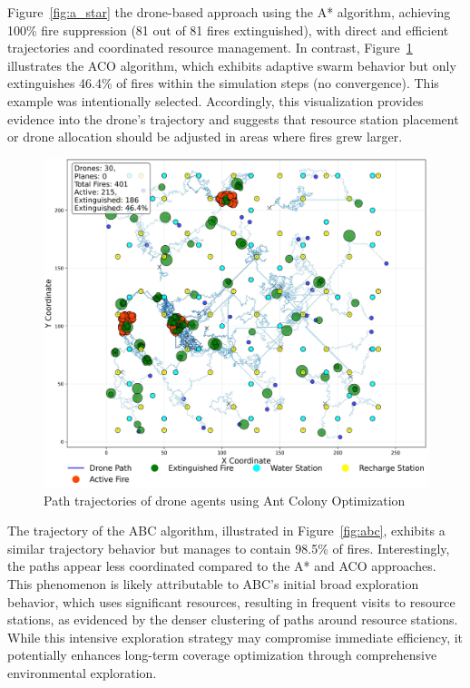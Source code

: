 \documentclass[11pt, a4paper]{article}
\begin{document}
Figure~\ref{fig:a_star} the drone-based approach using the A* algorithm, achieving 100\% fire suppression (81 out of 81 fires extinguished), with direct and efficient trajectories and coordinated resource management. In contrast, Figure~\ref{fig:aco} illustrates the ACO algorithm, which exhibits adaptive swarm behavior but only extinguishes 46.4\% of fires within the simulation steps (no convergence). This example was intentionally selected. Accordingly, this visualization provides evidence into the drone's trajectory and suggests that resource station placement or drone allocation should be adjusted in areas where fires grew larger.

\begin{figure}[htbp]
    \centering
    \includegraphics[width=0.9\linewidth]{figures/ACO_agent_paths.jpeg}
    \caption{Path trajectories of drone agents using Ant Colony Optimization}
    \label{fig:aco}
\end{figure}

The trajectory of the ABC algorithm, illustrated in Figure~\ref{fig:abc}, exhibits a similar trajectory behavior but manages to contain 98.5\% of fires. Interestingly, the paths appear less coordinated compared to the A* and ACO approaches. This phenomenon is likely attributable to ABC's initial broad exploration behavior, which uses significant resources, resulting in frequent visits to resource stations, as evidenced by the denser clustering of paths around resource stations. While this intensive exploration strategy may compromise immediate efficiency, it potentially enhances long-term coverage optimization through comprehensive environmental exploration.
\end{document}
